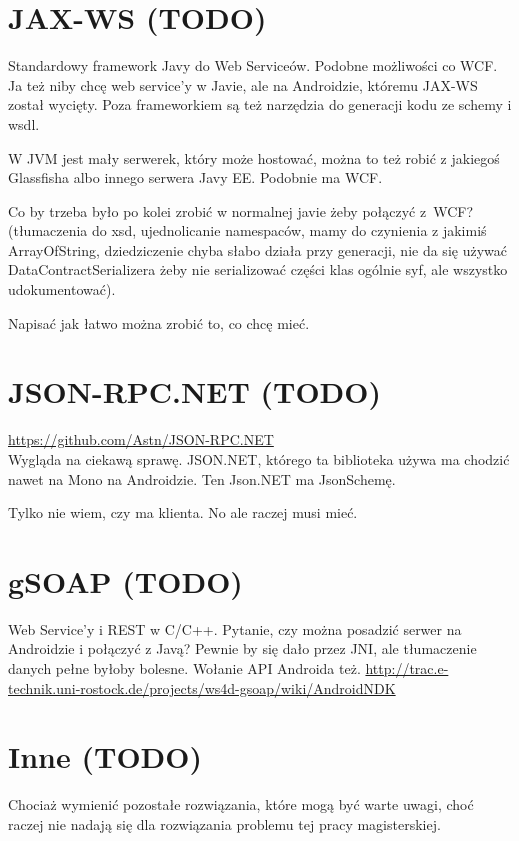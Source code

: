 \section{JAX-WS (TODO)}
Standardowy framework Javy do Web Serviceów. Podobne możliwości co WCF\@. Ja też niby chcę web service'y w Javie, ale na Androidzie, któremu JAX-WS został wycięty.
Poza frameworkiem są też narzędzia do generacji kodu ze schemy i wsdl.

W JVM jest mały serwerek, który może hostować, można to też robić z jakiegoś Glassfisha albo innego serwera Javy EE\@. Podobnie ma WCF.

Co by trzeba było po kolei zrobić w normalnej javie żeby połączyć z~WCF? (tłumaczenia do xsd, ujednolicanie namespaców, mamy do czynienia z jakimiś ArrayOfString, dziedziczenie chyba słabo działa przy generacji, nie da się używać DataContractSerializera żeby nie serializować części klas ogólnie syf, ale wszystko udokumentować). 

Napisać jak łatwo można zrobić to, co chcę mieć.



\section{JSON-RPC.NET (TODO)}
\url{https://github.com/Astn/JSON-RPC.NET} \\
Wygląda na ciekawą sprawę. JSON.NET, którego ta biblioteka używa ma chodzić nawet na Mono na Androidzie. Ten Json.NET ma JsonSchemę.

Tylko nie wiem, czy ma klienta. No ale raczej musi mieć.



\section{gSOAP (TODO)}
Web Service'y i REST w C/C++. Pytanie, czy można posadzić serwer na Androidzie i połączyć z Javą?
Pewnie by się dało przez JNI, ale tłumaczenie danych pełne byłoby bolesne. Wołanie API Androida też.
\url{http://trac.e-technik.uni-rostock.de/projects/ws4d-gsoap/wiki/AndroidNDK}\\ 



\section{Inne (TODO)}
Chociaż wymienić pozostałe rozwiązania, które mogą być warte uwagi, choć raczej nie nadają się dla rozwiązania problemu tej pracy magisterskiej.

